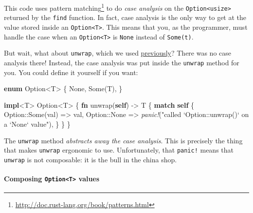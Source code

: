 \documentclass[a4paper,]{book}
\newenvironment{Shaded}{\begin{snugshade}}{\end{snugshade}}
\newcommand{\KeywordTok}[1]{\textcolor[rgb]{0.13,0.29,0.53}{\textbf{{#1}}}}
\newcommand{\DataTypeTok}[1]{\textcolor[rgb]{0.13,0.29,0.53}{{#1}}}
\newcommand{\ConstantTok}[1]{\textcolor[rgb]{0.00,0.00,0.00}{{#1}}}
\newcommand{\StringTok}[1]{\textcolor[rgb]{0.31,0.60,0.02}{{#1}}}
\newcommand{\PreprocessorTok}[1]{\textcolor[rgb]{0.56,0.35,0.01}{\textit{{#1}}}}
\newcommand{\NormalTok}[1]{{#1}}
\renewcommand{\href}[2]{#2\footnote{\url{#1}}}
\let\oldparagraph\paragraph
\renewcommand{\paragraph}[1]{\oldparagraph{#1}\mbox{}}
\begin{document}
This code uses
\href{http://doc.rust-lang.org/book/patterns.html}{pattern matching} to
do \emph{case analysis} on the
\texttt{Option\textless{}usize\textgreater{}} returned by the
\texttt{find} function. In fact, case analysis is the only way to get at
the value stored inside an \texttt{Option\textless{}T\textgreater{}}.
This means that you, as the programmer, must handle the case when an
\texttt{Option\textless{}T\textgreater{}} is \texttt{None} instead of
\texttt{Some(t)}.

But wait, what about \texttt{unwrap}, which we used
\protect\hyperlink{code-unwrap-double}{previously}? There was no case
analysis there! Instead, the case analysis was put inside the
\texttt{unwrap} method for you. You could define it yourself if you
want:

\protect\hypertarget{code-option-def-unwrap}{}{}

\begin{Shaded}
\begin{Highlighting}[]
\KeywordTok{enum} \DataTypeTok{Option}\NormalTok{<T> \{}
    \ConstantTok{None}\NormalTok{,}
    \ConstantTok{Some}\NormalTok{(T),}
\NormalTok{\}}

\KeywordTok{impl}\NormalTok{<T> }\DataTypeTok{Option}\NormalTok{<T> \{}
    \KeywordTok{fn} \NormalTok{unwrap(}\KeywordTok{self}\NormalTok{) -> T \{}
        \KeywordTok{match} \KeywordTok{self} \NormalTok{\{}
            \DataTypeTok{Option}\NormalTok{::}\ConstantTok{Some}\NormalTok{(val) => val,}
            \DataTypeTok{Option}\NormalTok{::}\ConstantTok{None} \NormalTok{=>}
              \PreprocessorTok{panic!}\NormalTok{(}\StringTok{"called `Option::unwrap()` on a `None` value"}\NormalTok{),}
        \NormalTok{\}}
    \NormalTok{\}}
\NormalTok{\}}
\end{Highlighting}
\end{Shaded}

The \texttt{unwrap} method \emph{abstracts away the case analysis}. This
is precisely the thing that makes \texttt{unwrap} ergonomic to use.
Unfortunately, that \texttt{panic!} means that \texttt{unwrap} is not
composable: it is the bull in the china shop.

\hypertarget{composing-optiont-values}{\paragraph{\texorpdfstring{Composing
\texttt{Option\textless{}T\textgreater{}}
values}{Composing Option\textless{}T\textgreater{} values}}\label{composing-optiont-values}}
\end{document}
